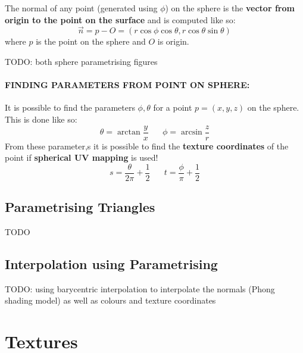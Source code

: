 \documentclass{article}
\begin{document}
The normal of any point (generated using $\phi$) on the sphere is the \textbf{vector from origin to the point on the surface} and is computed like so:
\begin{equation}
	\vec{n} = p - O = (r \cos \phi \cos \theta, r \cos \theta \sin \theta)
	\label{eq:sphere-normal}
\end{equation}
where $p$ is the point on the sphere and $O$ is origin.

TODO: both sphere parametrising figures

\paragraph{\textbf{FINDING PARAMETERS FROM POINT ON SPHERE}: } It is possible to find the parameters $\phi,\theta$ for a point $p = (x, y, z)$ on the sphere. This is done like so:
\begin{equation}
	\theta = \arctan \frac{y}{x} \;\;\;\;\;\;
	\phi = \arcsin \frac{z}{r}
	\label{eq:sphere-parameters-from-point}	
\end{equation}
From these parameter,s it is possible to find the \textbf{texture coordinates} of the point if \textbf{spherical UV mapping} is used!
\begin{equation}
	s = \frac{\theta}{2\pi} + \frac{1}{2} \;\;\;\;\;\;
	t = \frac{\phi}{\pi} + \frac{1}{2}
	\label{eq:sphere-parameters-uv-coords}
\end{equation}
\paragraph{}

\subsection{Parametrising Triangles}

TODO

\subsection{Interpolation using Parametrising}

TODO: using barycentric interpolation to interpolate the normals (Phong shading model) as well as colours and texture coordinates

\section{Textures}
\end{document}
